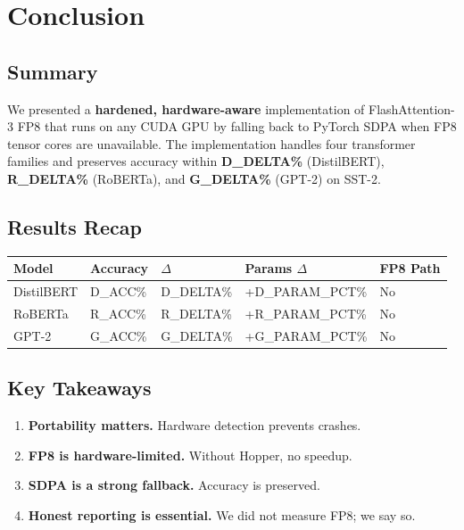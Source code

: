 
\section{Conclusion}

\subsection{Summary}

We presented a \textbf{hardened, hardware-aware} implementation of FlashAttention-3 
FP8 that runs on any CUDA GPU by falling back to PyTorch SDPA when FP8 
tensor cores are unavailable. The implementation handles four transformer 
families and preserves accuracy within \textbf{{{D\_DELTA}}\%} (DistilBERT), 
\textbf{{{R\_DELTA}}\%} (RoBERTa), and \textbf{{{G\_DELTA}}\%} (GPT-2) on SST-2.

\subsection{Results Recap}

\begin{table}[H]
\centering
\small
\begin{tabular}{lllll}
\toprule
\textbf{Model} & \textbf{Accuracy} & \textbf{$\Delta$} & \textbf{Params $\Delta$} & \textbf{FP8 Path} \\
\midrule
DistilBERT & {{D\_ACC}}\% & {{D\_DELTA}}\% & +{{D\_PARAM\_PCT}}\% & No \\
RoBERTa & {{R\_ACC}}\% & {{R\_DELTA}}\% & +{{R\_PARAM\_PCT}}\% & No \\
GPT-2 & {{G\_ACC}}\% & {{G\_DELTA}}\% & +{{G\_PARAM\_PCT}}\% & No \\
\bottomrule
\end{tabular}
\end{table}

\subsection{Key Takeaways}

\begin{enumerate}
\item \textbf{Portability matters.} Hardware detection prevents crashes.
\item \textbf{FP8 is hardware-limited.} Without Hopper, no speedup.
\item \textbf{SDPA is a strong fallback.} Accuracy is preserved.
\item \textbf{Honest reporting is essential.} We did not measure FP8; we say so.

\end{enumerate}
